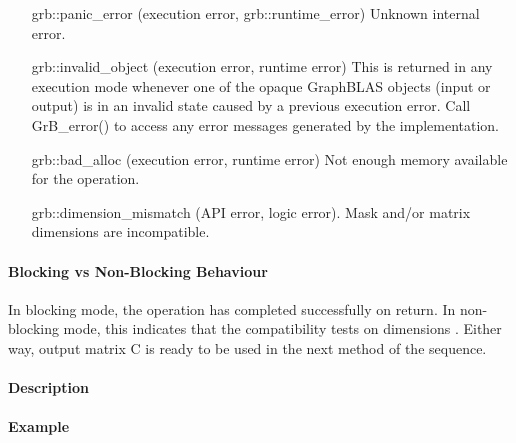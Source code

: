 \begin{itemize}[leftmargin=2.1in]
    \item[{\sf grb::panic\_error}]           (execution error, grb::runtime\_error) Unknown internal error.

    \item[{\sf grb::invalid\_object}] (execution error, runtime error) This is returned in any execution mode 
    whenever one of the opaque GraphBLAS objects (input or output) is in an invalid 
    state caused by a previous execution error.  Call {\sf GrB\_error()} to access 
    any error messages generated by the implementation.

    \item[{\sf grb::bad\_alloc}] (execution error, runtime error) Not enough memory available for the operation.

    \item[{\sf grb::dimension\_mismatch}] (API error, logic error). Mask and/or matrix
    dimensions are incompatible. 
\end{itemize}

\paragraph{Blocking vs Non-Blocking Behaviour}

In blocking mode, the operation has completed successfully on return.
In non-blocking mode, this indicates that the compatibility 
tests on dimensions . 
Either way, output matrix {\sf C} is ready to be used in the next method of
the sequence.

\paragraph{Description}


\paragraph{Example}


